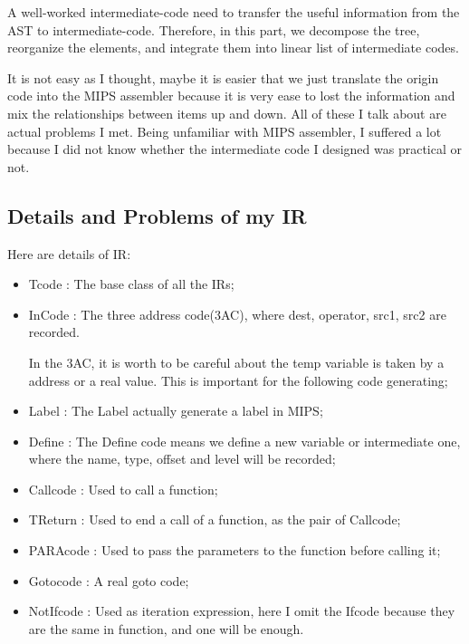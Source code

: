 \documentclass[preprint, 9pt]{sigplanconf}
\begin{document}
    A well-worked intermediate-code need to transfer the useful information from the AST to intermediate-code.
    Therefore, in this part, we decompose the tree, reorganize the elements, and integrate them into linear list of intermediate codes.

    It is not easy as I thought, maybe it is easier that we just translate the origin code into the MIPS assembler because it is very ease to lost the information and mix the relationships between items up and down.
    All of these I talk about are actual problems I met.
    Being unfamiliar with MIPS assembler, I suffered a lot because I did not know whether the intermediate code I designed was practical or not.

    \subsection{Details and Problems of my IR}
    Here are details of IR:
    \begin{itemize}
        \item{Tcode :}
            The base class of all the IRs;
        \item{InCode :}
            The three address code(3AC), where dest, operator, src1, src2 are recorded.

            In the 3AC, it is worth to be careful about the temp variable is taken by a address or a real value.
            This is important for the following code generating;
        \item{Label :}
            The Label actually generate a label in MIPS;
        \item{Define :}
            The Define code means we define a new variable or intermediate one, where the name, type, offset and level will be recorded;
        \item{Callcode :}
            Used to call a function;
        \item{TReturn :}
            Used to end a call of a function, as the pair of Callcode;
        \item{PARAcode :}
            Used to pass the parameters to the function before calling it;
        \item{Gotocode :}
            A real goto code;
        \item{NotIfcode :}
            Used as iteration expression, here I omit the Ifcode because they are the same in function, and one will be enough.
    \end{itemize}
\end{document}
